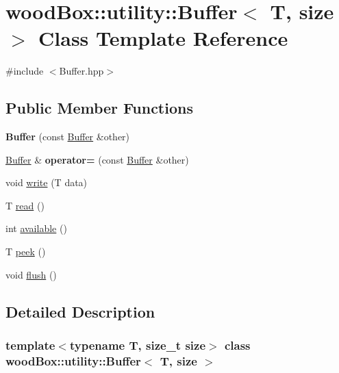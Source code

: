 \hypertarget{classwood_box_1_1utility_1_1_buffer}{}\section{wood\+Box\+:\+:utility\+:\+:Buffer$<$ T, size $>$ Class Template Reference}
\label{classwood_box_1_1utility_1_1_buffer}


{\ttfamily \#include $<$Buffer.\+hpp$>$}

\subsection*{Public Member Functions}
\begin{DoxyCompactItemize}
\item 
\mbox{\label{classwood_box_1_1utility_1_1_buffer_aebdfb364cf6e64092a1553231adb7a85}} 
{\bfseries Buffer} (const \mbox{\hyperlink{classwood_box_1_1utility_1_1_buffer}{Buffer}} \&other)
\item 
\mbox{\label{classwood_box_1_1utility_1_1_buffer_a051d336a9ee59bc40b7723ec3a54521e}} 
\mbox{\hyperlink{classwood_box_1_1utility_1_1_buffer}{Buffer}} \& {\bfseries operator=} (const \mbox{\hyperlink{classwood_box_1_1utility_1_1_buffer}{Buffer}} \&other)
\item 
void \mbox{\hyperlink{classwood_box_1_1utility_1_1_buffer_a2d7857dc93d7e229941ca36a018587e9}{write}} (T data)
\item 
T \mbox{\hyperlink{classwood_box_1_1utility_1_1_buffer_a8832f6e544e23f738ee50216d805572d}{read}} ()
\item 
int \mbox{\hyperlink{classwood_box_1_1utility_1_1_buffer_a2bcef18ccdd923a401608a257e4283ca}{available}} ()
\item 
T \mbox{\hyperlink{classwood_box_1_1utility_1_1_buffer_a9aa51ab0987fdbcfb72fccc1c806ba50}{peek}} ()
\item 
void \mbox{\hyperlink{classwood_box_1_1utility_1_1_buffer_a747e6bb3cd527dcf1651aa6758233666}{flush}} ()
\end{DoxyCompactItemize}


\subsection{Detailed Description}
\subsubsection*{template$<$typename T, size\+\_\+t size$>$\newline
class wood\+Box\+::utility\+::\+Buffer$<$ T, size $>$}


